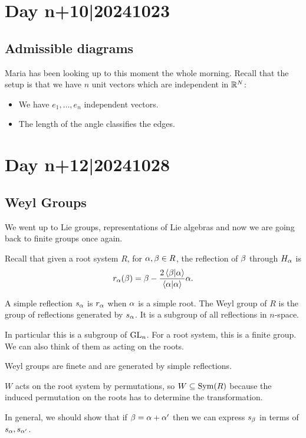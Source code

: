 \documentclass[12pt]{memoir}
\begin{document}
\section{Day n+10|20241023}

\subsection{Admissible diagrams}

Maria has been looking up to this moment the whole morning. Recall that the setup is that we have $n$ unit vectors which are independent in $\mathbb{R}^N$:
\begin{itemize}
    \item We have $e_1,\dots,e_n$ independent vectors.
    \item The length of the angle classifies the edges.
\end{itemize}

\section{Day n+12|20241028}

\subsection{Weyl Groups}

We went up to Lie groups, representations of Lie algebras and now we are going back to finite groups once again.\par
Recall that given a root system $R$, for $\alpha,\beta\in R$, the reflection of $\beta$ through $H_\alpha$ is 
$$r_\alpha(\beta)=\beta-\frac{2\braket{\beta}{\alpha}}{\braket{\alpha}{\alpha}}\alpha.$$
\begin{Def}
    A simple reflection $s_\alpha$ is $r_\alpha$ when $\alpha$ is a simple root. The Weyl group of $R$ is the group of reflections generated by $s_\alpha$. It is a subgroup of all reflections in $n$-space.
\end{Def}

In particular this is a subgroup of $\mathrm{GL}_n$. For a root system, this is a finite group. We can also think of them as acting on the roots. 

\begin{Lem}
    Weyl groups are finete and are generated by simple reflections.
\end{Lem}

$W$ acts on the root system by permutations, so $W\subseteq\operatorname{Sym}(R)$ because the induced permutation on the roots has to determine the transformation.\par
In general, we should show that if $\beta=\alpha+\alpha'$ then we can express $s_\beta$ in terms of $s_\alpha,s_{\alpha'}$.
\end{document}
